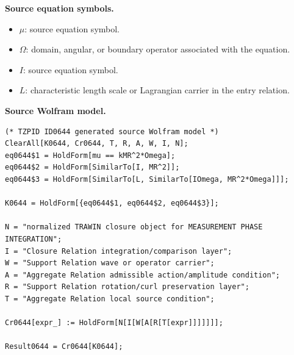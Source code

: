 \begin{minipage}[t]{0.49\linewidth}
\begingroup
\small
\raggedright
\textbf{Source equation symbols.}\par
\begin{itemize}[leftmargin=1.35em,itemsep=1pt,topsep=1pt,parsep=0pt]
    \item $\mu$: source equation symbol.
    \item $\Omega$: domain, angular, or boundary operator associated with the equation.
    \item $I$: source equation symbol.
    \item $L$: characteristic length scale or Lagrangian carrier in the entry relation.
\end{itemize}
\endgroup
\end{minipage}\hfill
\begin{minipage}[t]{0.47\linewidth}
\begingroup
\scriptsize
\raggedright
\textbf{Source Wolfram model.}\par
\begin{Verbatim}[fontsize=\tiny,breaklines=true,breakanywhere=true]
(* TZPID ID0644 generated source Wolfram model *)
ClearAll[K0644, Cr0644, T, R, A, W, I, N];
eq0644$1 = HoldForm[mu == kMR^2*Omega];
eq0644$2 = HoldForm[SimilarTo[I, MR^2]];
eq0644$3 = HoldForm[SimilarTo[L, SimilarTo[IOmega, MR^2*Omega]]];

K0644 = HoldForm[{eq0644$1, eq0644$2, eq0644$3}];

N = "normalized TRAWIN closure object for MEASUREMENT PHASE INTEGRATION";
I = "Closure Relation integration/comparison layer";
W = "Support Relation wave or operator carrier";
A = "Aggregate Relation admissible action/amplitude condition";
R = "Support Relation rotation/curl preservation layer";
T = "Aggregate Relation local source condition";

Cr0644[expr_] := HoldForm[N[I[W[A[R[T[expr]]]]]]];

Result0644 = Cr0644[K0644];
\end{Verbatim}
\endgroup
\end{minipage}

